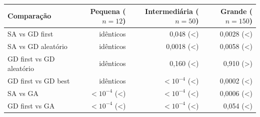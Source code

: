 \begin{tabular}{lrrr}
\toprule
Comparação & Pequena ($n=12$) & Intermediária ($n=50$) & Grande ($n=150$) \\
\midrule
SA vs GD first & idênticos & 0,048 (<) & 0,0028 (<) \\
SA vs GD aleatório & idênticos & 0,0018 (<) & 0,0058 (<) \\
GD first vs GD aleatório & idênticos & 0,160 (<) & 0,910 (>) \\
GD first vs GD best & idênticos & $<10^{-4}$ (<) & 0,0002 (<) \\
SA vs GA & $<10^{-4}$ (<) & $<10^{-4}$ (<) & 0,0006 (<) \\
GD first vs GA & $<10^{-4}$ (<) & $<10^{-4}$ (<) & 0,054 (<) \\
\bottomrule
\end{tabular}
